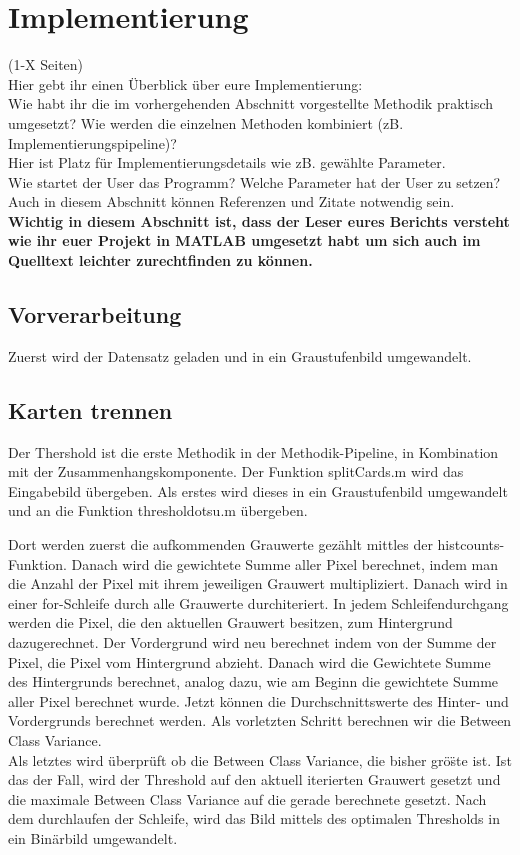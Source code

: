 \documentclass[paper=A4, deutsch]{scrartcl}
\begin{document}
\section{Implementierung}
(1-X Seiten)\\
Hier gebt ihr einen Überblick über eure Implementierung:\\
Wie habt ihr die im vorhergehenden Abschnitt vorgestellte Methodik praktisch umgesetzt? Wie werden die einzelnen Methoden kombiniert (zB. Implementierungspipeline)?\\
Hier ist Platz für Implementierungsdetails wie zB. gewählte Parameter. \\
Wie startet der User das Programm? Welche Parameter hat der User zu setzen?\\
Auch in diesem Abschnitt können Referenzen und Zitate notwendig sein.\\
\textbf{Wichtig in diesem Abschnitt ist, dass der Leser eures Berichts versteht wie ihr euer Projekt in MATLAB umgesetzt habt um sich auch im Quelltext leichter zurechtfinden zu können.}

\subsection{Vorverarbeitung}
Zuerst wird der Datensatz geladen und in ein Graustufenbild umgewandelt.

\subsection{Karten trennen}
Der Thershold ist die erste Methodik in der Methodik-Pipeline, in Kombination mit der Zusammenhangskomponente. Der Funktion splitCards.m wird das Eingabebild \"ubergeben. 
Als erstes wird dieses in ein Graustufenbild umgewandelt und an die Funktion thresholdotsu.m \"ubergeben. 

Dort werden zuerst die aufkommenden Grauwerte gez\"ahlt mittles der histcounts-Funktion. Danach wird die gewichtete Summe aller Pixel berechnet, indem man die Anzahl der Pixel mit ihrem jeweiligen Grauwert multipliziert.
Danach wird in einer for-Schleife durch alle Grauwerte durchiteriert. In jedem Schleifendurchgang werden die Pixel, die den aktuellen Grauwert besitzen,
zum Hintergrund dazugerechnet. Der Vordergrund wird neu berechnet indem von der Summe der Pixel, die Pixel vom Hintergrund abzieht. 
Danach wird die Gewichtete Summe des Hintergrunds berechnet, analog dazu, wie am Beginn die gewichtete Summe aller Pixel berechnet wurde.
Jetzt k\"onnen die Durchschnittswerte des Hinter- und Vordergrunds berechnet werden. Als vorletzten Schritt berechnen wir die Between Class Variance.
\\
Als letztes wird \"uberpr\"uft ob die Between Class Variance, die bisher gr\"o\"ste ist. Ist das der Fall, wird der Threshold auf den aktuell iterierten
Grauwert gesetzt und die maximale Between Class Variance auf die gerade berechnete gesetzt.
Nach dem durchlaufen der Schleife, wird das Bild mittels des optimalen Thresholds in ein Bin\"arbild umgewandelt.
\end{document}
